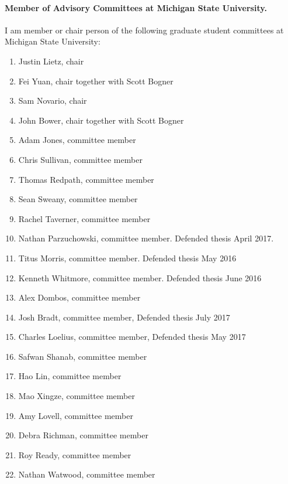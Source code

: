 \documentclass[a4wide,10pt]{article}
\begin{document}
\paragraph{Member of Advisory Committees at Michigan State University.}
I am member or chair person of the following graduate  student committees at Michigan State University:
\begin{enumerate}
\item Justin Lietz, chair

\item Fei Yuan, chair together with Scott Bogner 

\item Sam Novario, chair

\item John Bower, chair together with Scott Bogner  

\item Adam Jones, committee member

\item Chris Sullivan, committee member

\item Thomas Redpath, committee member

\item Sean Sweany, committee member

\item Rachel Taverner, committee member

\item Nathan Parzuchowski, committee member. Defended thesis April 2017.

\item Titus Morris, committee member. Defended thesis May 2016

\item Kenneth Whitmore, committee member. Defended thesis June 2016

\item Alex Dombos, committee member

\item Josh Bradt, committee member, Defended thesis July 2017

\item Charles Loelius, committee member, Defended thesis May 2017

\item Safwan Shanab, committee member

\item Hao Lin, committee member

\item Mao Xingze, committee member

\item Amy Lovell, committee member

\item Debra Richman, committee member

\item Roy Ready, committee member

\item Nathan Watwood, committee member 
\end{enumerate}
\end{document}
